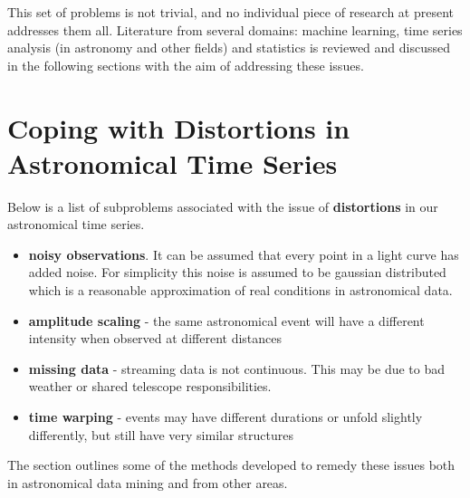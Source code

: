 	This set of problems is not trivial, and no individual piece of research at present addresses them all. Literature from several domains: machine learning, time series analysis (in astronomy and other fields) and statistics is reviewed and discussed in the following sections with the aim of addressing these issues.
		

	\section{Coping with Distortions in Astronomical Time Series}
	Below is a list of subproblems associated with the issue of \textbf{distortions} in our astronomical time series.
	\begin{itemize}
		\item \textbf{noisy observations}. It can be assumed that every point in a light curve has added noise. For simplicity this noise is assumed to be gaussian distributed which is a reasonable approximation of real conditions in astronomical data.
		\item \textbf{amplitude scaling} - the same astronomical event will have a different intensity when observed at different distances
		\item \textbf{missing data} - streaming data is not continuous. This may be due to bad weather or shared telescope responsibilities.
		\item \textbf{time warping} - events may have different durations or unfold slightly differently, but still have very similar structures
	\end{itemize}
	The section outlines some of the methods developed to remedy these issues both in astronomical data mining and from other areas.
	
